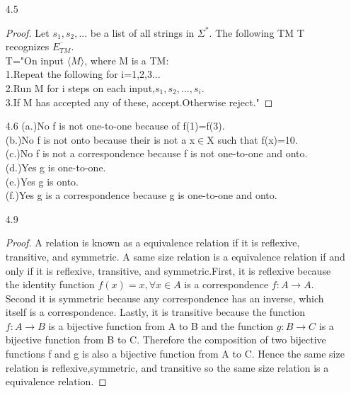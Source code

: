 \documentclass[10pt] {article}
\begin{document}
\begin{enumerate}
\begin{proof}
Let the Turning Machine T be the TM that decides $A_{\varepsilon CFG}$.\\
T="On input $\langle G \rangle$ where G is a context free grammar.\\
1.Convert the grammar G to a CFG G' in CNF. \\
2.If $G'$ contains the production $S \rightarrow \varepsilon$ accept, otherwise reject.
"
\end{proof}
\item[4.5]
\begin{proof}
Let $s_1,s_2,...$ be a list of all strings in $\Sigma^*$. The following TM T recognizes $\overline{E_{TM}}$.\\
T="On input $\langle M \rangle$, where M is a TM:\\
1.Repeat the following for i=1,2,3...\\
2.Run M for i steps on each input,$s_1,s_2,...,s_i$.\\
3.If M has accepted any of these, accept.Otherwise reject."
\end{proof}
\item[4.6](a.)No f is not one-to-one because of f(1)=f(3). \\
(b.)No f is not onto because their is not a x$\in$X such that f(x)=10.\\
(c.)No f is not a correspondence because f is not one-to-one and onto.\\
(d.)Yes g is one-to-one.\\
(e.)Yes g is onto.\\
(f.)Yes g is a correspondence because g is one-to-one and onto.
\item[4.9]\begin{proof}
A relation is known as a equivalence relation if it is reflexive, transitive, and symmetric. A same size relation is a equivalence relation if and only if it is reflexive, transitive, and symmetric.First, it is reflexive because the identity function $f(x)=x,\forall x \in A$ is a correspondence $f: A \rightarrow A$. Second it is symmetric because any correspondence has an inverse, which itself is a correspondence. Lastly, it is transitive because the function $f:A \rightarrow B$ is a bijective function from A to B and the function $g: B \rightarrow C$ is a bijective function from B to C. Therefore the composition of two bijective functions f and g is also a bijective function from A to C.  Hence the same size relation is reflexive,symmetric, and transitive so the same size relation is a equivalence relation.
\end{proof}
\end{enumerate} 
\end{document}
